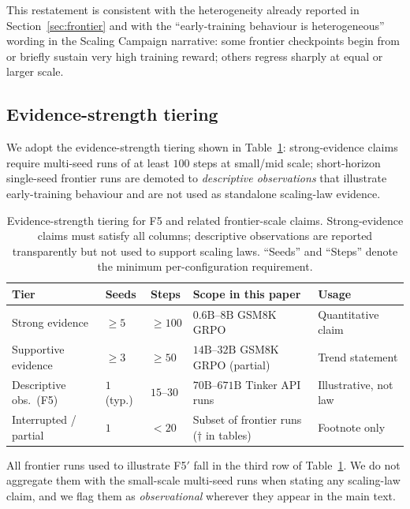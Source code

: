 This restatement is consistent with the heterogeneity already reported in
Section~\ref{sec:frontier} and with the ``early-training behaviour is
heterogeneous'' wording in the Scaling Campaign narrative: some frontier
checkpoints begin from or briefly sustain very high training reward; others
regress sharply at equal or larger scale.

\subsection{Evidence-strength tiering}

We adopt the evidence-strength tiering shown in
Table~\ref{tab:f5_evidence_tiers}: strong-evidence claims require multi-seed
runs of at least $100$ steps at small/mid scale; short-horizon single-seed
frontier runs are demoted to \emph{descriptive observations} that illustrate
early-training behaviour and are not used as standalone scaling-law evidence.

\begin{table}[htbp]
\centering
\caption{Evidence-strength tiering for F5 and related frontier-scale claims.
Strong-evidence claims must satisfy all columns; descriptive observations are
reported transparently but not used to support scaling laws. ``Seeds'' and
``Steps'' denote the minimum per-configuration requirement.}
\label{tab:f5_evidence_tiers}
\footnotesize
\setlength{\tabcolsep}{4pt}
\begin{tabular}{@{}l l l l l@{}}
\toprule
\textbf{Tier} & \textbf{Seeds} & \textbf{Steps} & \textbf{Scope in this paper} & \textbf{Usage} \\
\midrule
Strong evidence        & $\geq 5$ & $\geq 100$ & $0.6\mathrm{B}$--$8\mathrm{B}$ GSM8K GRPO & Quantitative claim \\
Supportive evidence    & $\geq 3$ & $\geq 50$  & $14\mathrm{B}$--$32\mathrm{B}$ GSM8K GRPO (partial) & Trend statement \\
Descriptive obs.\ (F5) & $1$ (typ.)   & $15$--$30$ & $70\mathrm{B}$--$671\mathrm{B}$ Tinker API runs  & Illustrative, not law \\
Interrupted / partial  & $1$       & $<20$      & Subset of frontier runs ($\dagger$ in tables) & Footnote only \\
\bottomrule
\end{tabular}
\end{table}

All frontier runs used to illustrate F5$'$ fall in the third row of
Table~\ref{tab:f5_evidence_tiers}. We do not aggregate them with the
small-scale multi-seed runs when stating any scaling-law claim, and we flag
them as \emph{observational} wherever they appear in the main text.

